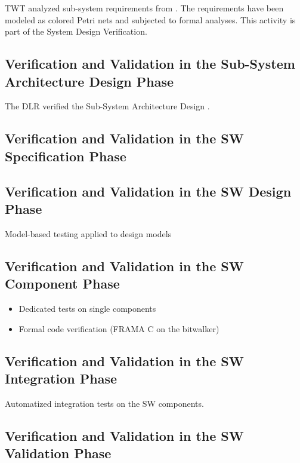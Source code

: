 \documentclass{template/openetcs_article}
\begin{document}
TWT analyzed sub-system requirements from \cite[Chapter~5]{subset-026:3.3.0}. The
requirements have been modeled as colored Petri nets and subjected to
formal analyses. This activity is part of the System Design
Verification. 

\subsection{Verification and Validation in the Sub-System Architecture Design Phase}
\label{sec:vnv-2}

The DLR verified the Sub-System Architecture Design
. 

\subsection{Verification and Validation in the SW Specification Phase}
\label{sec:vnv-3}

\subsection{Verification and Validation in the SW Design Phase}
\label{sec:vnv-4}

Model-based testing applied to design models  

\subsection{Verification and Validation in the SW Component Phase}
\label{sec:vnv-5}

\begin{itemize}
\item Dedicated tests on single components 
\item Formal code verification (FRAMA C on the bitwalker)
\end{itemize}


\subsection{Verification and Validation in the SW Integration Phase}
\label{sec:vnv-6}

Automatized integration tests on the SW components. 

\subsection{Verification and Validation in the SW Validation Phase}
\label{sec:vnv-7}
\end{document}
